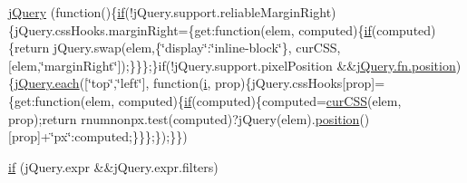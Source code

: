 \begin{DoxyCompactItemize}
\hyperlink{jquery-1_89_81_8js_a5e01048fbd3a30b44e8d491d8945c457}{j\+Query} (function()\{\hyperlink{fullpage_2plugin_8js_a8b98017e64ef036adb9ae327ff94abe1}{if}(!j\+Query.\+support.\+reliable\+Margin\+Right)\{j\+Query.\+css\+Hooks.\+margin\+Right=\{get\+:function(elem, computed)\{\hyperlink{fullpage_2plugin_8js_a8b98017e64ef036adb9ae327ff94abe1}{if}(computed)\{return j\+Query.\+swap(elem,\{\char`\"{}display\char`\"{}\+:\char`\"{}inline-\/block\char`\"{}\}, cur\+C\+S\+S, \mbox{[}elem,\char`\"{}margin\+Right\char`\"{}\mbox{]});\}\}\};\}if(!j\+Query.\+support.\+pixel\+Position \&\&\hyperlink{jquery-ui_8js_a5cd004409a854f3c106e2c3424b89292}{j\+Query.\+fn.\+position})\{\hyperlink{fullpage_2plugin_8min_8js_a536422939f8cd6b5867a8fb424c3c02e}{j\+Query.\+each}(\mbox{[}\char`\"{}top\char`\"{},\char`\"{}left\char`\"{}\mbox{]}, function(\hyperlink{validate_8js_a5e25b1d1bed9ab5f3174b76d6a722180}{i}, prop)\{j\+Query.\+css\+Hooks\mbox{[}prop\mbox{]}=\{get\+:function(elem, computed)\{\hyperlink{fullpage_2plugin_8js_a8b98017e64ef036adb9ae327ff94abe1}{if}(computed)\{computed=\hyperlink{extras_2_scroller_2media_2docs_2media_2js_2jquery_8js_a2bac46970b28aa533a08cecff26eea5b}{cur\+C\+S\+S}(elem, prop);return rnumnonpx.\+test(computed)?j\+Query(elem).\hyperlink{jquery-ui_8js_a5cd004409a854f3c106e2c3424b89292}{position}()\mbox{[}prop\mbox{]}+\char`\"{}px\char`\"{}\+:computed;\}\}\};\});\}\})
\item 
\hyperlink{jquery-1_89_81_8js_a0335a19470806a284d8c38df8f5b5718}{if} (j\+Query.\+expr \&\&j\+Query.\+expr.\+filters)
\item 

\end{DoxyCompactItemize}

